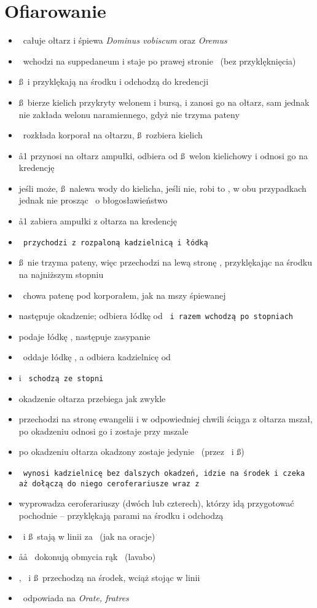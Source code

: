 \section{Ofiarowanie}

\begin{itemize}
	\item \ii~całuje ołtarz i śpiewa \textit{Dominus vobiscum} oraz
		\textit{Oremus}
	\item \dd~wchodzi na suppedaneum i staje po prawej stronie \ii~(bez
		przyklęknięcia)
	\item \ss~i  przyklękają na środku i odchodzą do kredencji
	\item \ss~bierze kielich przykryty welonem i bursą, i zanosi go na
		ołtarz, sam jednak nie zakłada welonu naramiennego, gdyż nie
		trzyma pateny
	\item \dd~rozkłada korporał na ołtarzu, \ss~rozbiera kielich
	\item \aa1 przynosi na ołtarz ampułki, odbiera od \ss~welon kielichowy i
		odnosi go na kredencję
	\item jeśli może, \ss~nalewa wody do kielicha, jeśli nie, robi to \dd, w
		obu przypadkach jednak nie prosząc \ii~o błogosławieństwo
	\item \aa1 zabiera ampułki z ołtarza na kredencję
	\item \tt~przychodzi z rozpaloną kadzielnicą i łódką
	\item \ss~nie trzyma pateny, więc przechodzi na lewą stronę \ii,
		przyklękając na środku na najniższym stopniu
	\item \dd~chowa patenę pod korporałem, jak na mszy śpiewanej
	\item następuje okadzenie;  odbiera łódkę od \tt~i razem wchodzą po
		stopniach
	\item {} podaje łódkę \dd, następuje zasypanie
	\item \dd~oddaje łódkę , a odbiera kadzielnicę od \tt
	\item {} i \tt~schodzą ze stopni
	\item okadzenie ołtarza przebiega jak zwykle
	\item {} przechodzi na stronę ewangelii i w odpowiedniej chwili ściąga
		z ołtarza mszał, po okadzeniu odnosi go i zostaje przy mszale
	\item po okadzeniu ołtarza okadzony zostaje jedynie \ii~(przez \dd~i \ss)
	\item \tt~wynosi kadzielnicę bez dalszych okadzeń, idzie na środek
		i czeka aż dołączą do niego ceroferariusze wraz z 
	\item {} wyprowadza ceroferariuszy (dwóch lub czterech), którzy idą
		przygotować pochodnie – przyklękają parami na środku i odchodzą
	\item \dd~i \ss~stają w linii za \ii~(jak na oracje)
	\item \aa\aa~ dokonują obmycia rąk \ii~(lavabo)
	\item \ii, \dd~i \ss~przechodzą na środek, wciąż stojąc w linii
	\item \dd~odpowiada na \textit{Orate, fratres}
\end{itemize}


